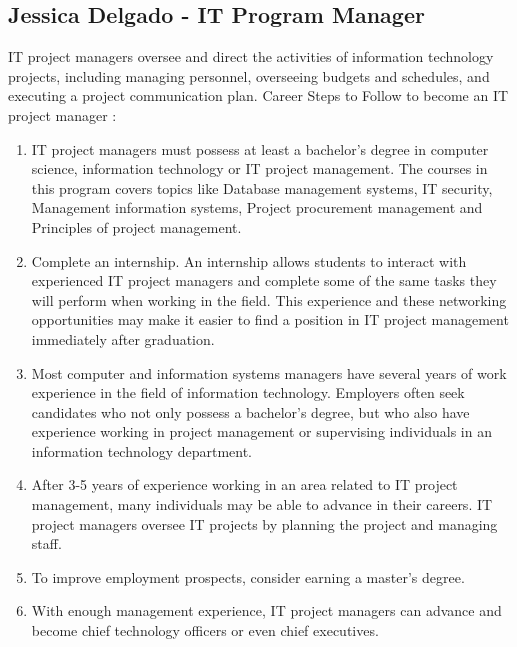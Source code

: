 \documentclass[11pt, oneside, a4paper, titlepage]{article}
\begin{document}
\subsection{Jessica Delgado - IT Program Manager}
IT project managers oversee and direct the activities of information technology projects, including managing personnel, overseeing budgets and schedules, and executing a project communication plan. Career Steps to Follow to become an IT project manager : 
\begin{enumerate}
	\item
    IT project managers must possess at least a bachelor's degree in computer science, information technology or IT project management. The courses in this program covers topics like Database management systems, IT security, Management information systems, Project procurement management and Principles of project management. 
	\item
    Complete an internship. An internship allows students to interact with experienced IT project managers and complete some of the same tasks they will perform when working in the field. This experience and these networking opportunities may make it easier to find a position in IT project management immediately after graduation. 
	\item
    Most computer and information systems managers have several years of work experience in the field of information technology. Employers often seek candidates who not only possess a bachelor's degree, but who also have experience working in project management or supervising individuals in an information technology department. 
	\item
    After 3-5 years of experience working in an area related to IT project management, many individuals may be able to advance in their careers. IT project managers oversee IT projects by planning the project and managing staff. 
	\item
    To improve employment prospects, consider earning a master's degree.  
	\item
    With enough management experience, IT project managers can advance and become chief technology officers or even chief executives. 
\end{enumerate}
\newpage
\end{document}
